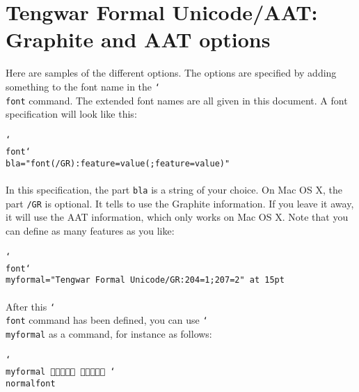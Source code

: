 \documentclass[11pt,a4paper]{article}
\begin{document}
\tableofcontents

\section{Tengwar Formal Unicode/AAT: Graphite and AAT options}

Here are samples of the different options. The options are specified by adding something to the font name in the \texttt{\char`\\font} command. The extended font names are all given in this document. A font specification will look like this:

\paragraph{} \texttt{\char`\\font\char`\\bla="font(/GR):feature=value(;feature=value)"}

\paragraph{} In this specification, the part \texttt{bla} is a string of your choice. On Mac OS X, the part \texttt{/GR} is optional. It tells \XeTeX{} to use the Graphite information. If you leave it away, it will use the AAT information, which only works on Mac OS X. Note that you can define as many features as you like:

\paragraph{} \texttt{\char`\\font\char`\\myformal="Tengwar Formal Unicode/GR:204=1;207=2" at 15pt}

\paragraph{} After this \texttt{\char`\\font} command has been defined, you can use \texttt{\char`\\myformal} as a command, for instance as follows:

\paragraph{} \texttt{\char`\\myformal   \char`\\normalfont}
\end{document}
